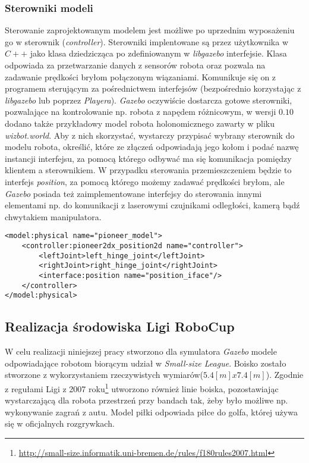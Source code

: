 	\subsubsection{Sterowniki modeli }
	Sterowanie zaprojektowanym modelem jest możliwe po uprzednim wyposażeniu go w sterownik (\textit{controller}). Sterowniki implentowane są przez użytkownika w $C++$ jako klasa dziedzicząca
	po zdefiniowanym w \textit{libgazebo} interfejsie. Klasa odpowiada za przetwarzanie danych z sensorów robota oraz pozwala
	na zadawanie prędkości bryłom połączonym wiązaniami. Komunikuje się on z programem sterującym za pośrednictwem interfejsów (bezpośrednio korzystając z \textit{libgazebo} lub poprzez \textit{Playera}).
	\textit{Gazebo} oczywiście dostarcza gotowe sterowniki, pozwalające na kontrolowanie np. robota z napędem różnicowym, w wersji $0.10$ dodano także przykładowy model robota holonomicznego zawarty
	w pliku \textit{wizbot.world}. Aby z nich skorzystać, wystarczy przypisać wybrany sterownik do modelu robota, określić, które ze złączeń odpowiadają jego kołom i podać nazwę instancji interfejsu,
	za pomocą którego odbywać ma się komunikacja pomiędzy klientem a sterownikiem. W przypadku sterowania przemieszczeniem będzie to interfejs \textit{position}, za pomocą którego możemy zadawać prędkości bryłom,
	ale \textit{Gazebo} posiada też zaimplementowane interfejsy do sterowania innymi elementami np. do komunikacji z laserowymi czujnikami odległości, kamerą bądź chwytakiem manipulatora. 
	\begin{lstlisting}
<model:physical name="pioneer_model">
    <controller:pioneer2dx_position2d name="controller">
        <leftJoint>left_hinge_joint</leftJoint>
        <rightJoint>right_hinge_joint</rightJoint>
        <interface:position name="position_iface"/>
    </controller>
</model:physical>
	\end{lstlisting}	

	
	\subsection{Realizacja środowiska Ligi RoboCup \label{subsect:realizacjaROBOCUP} }
	
	W celu realizacji niniejszej pracy stworzono dla symulatora \textit{Gazebo} modele odpowiadające robotom biorącym udział w \emph{Small-size League}. 
	Boisko zostało stworzone z wykorzystaniem rzeczywistych wymiarów($5.4[m] x 7.4[m]$). 
	Zgodnie z regułami Ligi z 2007 roku\protect\footnote{\url{http://small-size.informatik.uni-bremen.de/rules/f180rules2007.html}} utworzono również linie boiska, 
	pozostawiając wystarczającą dla robota przestrzeń przy bandach tak, żeby było możliwe np. wykonywanie zagrań z autu. 
	Model piłki odpowiada piłce do golfa, której używa się w oficjalnych rozgrywkach.
	
